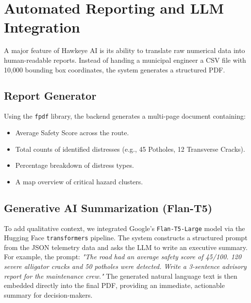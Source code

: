 \section{Automated Reporting and LLM Integration}
A major feature of Hawkeye AI is its ability to translate raw numerical data into human-readable reports. Instead of handing a municipal engineer a CSV file with 10,000 bounding box coordinates, the system generates a structured PDF.

\subsection{Report Generator}
Using the \texttt{fpdf} library, the backend generates a multi-page document containing:
\begin{itemize}
    \item Average Safety Score across the route.
    \item Total counts of identified distresses (e.g., 45 Potholes, 12 Transverse Cracks).
    \item Percentage breakdown of distress types.
    \item A map overview of critical hazard clusters.
\end{itemize}

\subsection{Generative AI Summarization (Flan-T5)}
To add qualitative context, we integrated Google's \texttt{Flan-T5-Large} model via the Hugging Face \texttt{transformers} pipeline. The system constructs a structured prompt from the JSON telemetry data and asks the LLM to write an executive summary.
For example, the prompt: \textit{"The road had an average safety score of 45/100. 120 severe alligator cracks and 50 potholes were detected. Write a 3-sentence advisory report for the maintenance crew."}
The generated natural language text is then embedded directly into the final PDF, providing an immediate, actionable summary for decision-makers.

\lipsum[19-24] %
